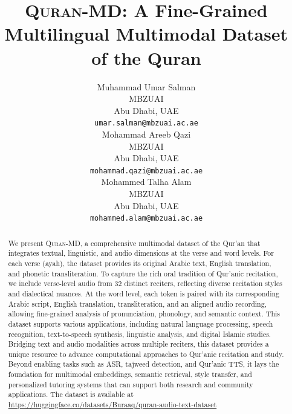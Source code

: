 \documentclass{article}
\title{\textsc{Quran-MD}: A Fine-Grained Multilingual Multimodal Dataset of the Quran}
\author{%
  Muhammad Umar Salman \\
  MBZUAI\\
  Abu Dhabi, UAE\\
  \texttt{umar.salman@mbzuai.ac.ae} \\
  \And
  Mohammad Areeb Qazi \\
  MBZUAI\\
  Abu Dhabi, UAE\\
  \texttt{mohammad.qazi@mbzuai.ac.ae} \\
   \And
  Mohammed Talha Alam \\
  MBZUAI\\
  Abu Dhabi, UAE\\
  \texttt{mohammed.alam@mbzuai.ac.ae} \\
}
\begin{document}
\maketitle


\begin{abstract}
  We present \textsc{Quran-MD}, a comprehensive multimodal dataset of the Qur’an that integrates textual, linguistic, and audio dimensions at the verse and word levels. For each verse (ayah), the dataset provides its original Arabic text, English translation, and phonetic transliteration. To capture the rich oral tradition of Qur’anic recitation, we include verse-level audio from 32 distinct reciters, reflecting diverse recitation styles and dialectical nuances. At the word level, each token is paired with its corresponding Arabic script, English translation, transliteration, and an aligned audio recording, allowing fine-grained analysis of pronunciation, phonology, and semantic context. This dataset supports various applications, including natural language processing, speech recognition, text-to-speech synthesis, linguistic analysis, and digital Islamic studies. Bridging text and audio modalities across multiple reciters, this dataset provides a unique resource to advance computational approaches to Qur’anic recitation and study. Beyond enabling tasks such as ASR, tajweed detection, and Qur’anic TTS, it lays the foundation for multimodal embeddings, semantic retrieval, style transfer, and personalized tutoring systems that can support both research and community applications. The dataset is available at \url{https://huggingface.co/datasets/Buraaq/quran-audio-text-dataset}

\end{abstract}

 
 


 







\end{document}
